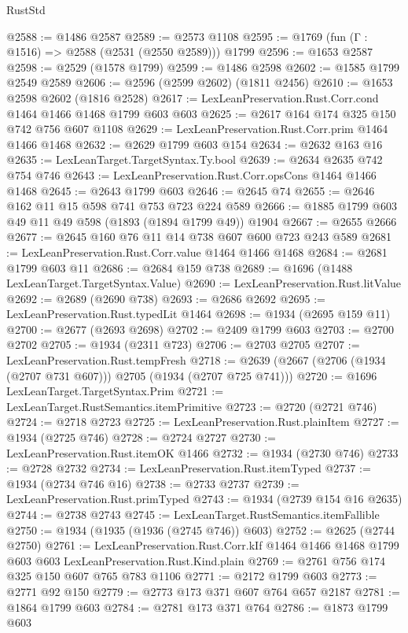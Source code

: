 \begin{lexlean}{RustStd}
\begin{coremodule}
@2588 := @1486 @2587
@2589 := @2573 @1108
@2595 := @1769 (fun (Γ : @1516) => @2588 (@2531 (@2550 @2589))) @1799
@2596 := @1653 @2587
@2598 := @2529 (@1578 @1799)
@2599 := @1486 @2598
@2602 := @1585 @1799 @2549 @2589
@2606 := @2596 (@2599 @2602) (@1811 @2456)
@2610 := @1653 @2598 @2602 (@1816 @2528)
@2617 := LexLeanPreservation.Rust.Corr.cond @1464 @1466 @1468 @1799 @603 @603
@2625 := @2617 @164 @174 @325 @150 @742 @756 @607 @1108
@2629 := LexLeanPreservation.Rust.Corr.prim @1464 @1466 @1468
@2632 := @2629 @1799 @603 @154
@2634 := @2632 @163 @16
@2635 := LexLeanTarget.TargetSyntax.Ty.bool
@2639 := @2634 @2635 @742 @754 @746
@2643 := LexLeanPreservation.Rust.Corr.opsCons @1464 @1466 @1468
@2645 := @2643 @1799 @603
@2646 := @2645 @74
@2655 := @2646 @162 @11 @15 @598 @741 @753 @723 @224 @589
@2666 := @1885 @1799 @603 @49 @11 @49 @598 (@1893 (@1894 @1799 @49)) @1904
@2667 := @2655 @2666
@2677 := @2645 @160 @76 @11 @14 @738 @607 @600 @723 @243 @589
@2681 := LexLeanPreservation.Rust.Corr.value @1464 @1466 @1468
@2684 := @2681 @1799 @603 @11
@2686 := @2684 @159 @738
@2689 := @1696 (@1488 LexLeanTarget.TargetSyntax.Value)
@2690 := LexLeanPreservation.Rust.litValue
@2692 := @2689 (@2690 @738)
@2693 := @2686 @2692
@2695 := LexLeanPreservation.Rust.typedLit @1464
@2698 := @1934 (@2695 @159 @11)
@2700 := @2677 (@2693 @2698)
@2702 := @2409 @1799 @603
@2703 := @2700 @2702
@2705 := @1934 (@2311 @723)
@2706 := @2703 @2705
@2707 := LexLeanPreservation.Rust.tempFresh
@2718 := @2639 (@2667 (@2706 (@1934 (@2707 @731 @607))) @2705 (@1934 (@2707 @725 @741)))
@2720 := @1696 LexLeanTarget.TargetSyntax.Prim
@2721 := LexLeanTarget.RustSemantics.itemPrimitive
@2723 := @2720 (@2721 @746)
@2724 := @2718 @2723
@2725 := LexLeanPreservation.Rust.plainItem
@2727 := @1934 (@2725 @746)
@2728 := @2724 @2727
@2730 := LexLeanPreservation.Rust.itemOK @1466
@2732 := @1934 (@2730 @746)
@2733 := @2728 @2732
@2734 := LexLeanPreservation.Rust.itemTyped
@2737 := @1934 (@2734 @746 @16)
@2738 := @2733 @2737
@2739 := LexLeanPreservation.Rust.primTyped
@2743 := @1934 (@2739 @154 @16 @2635)
@2744 := @2738 @2743
@2745 := LexLeanTarget.RustSemantics.itemFallible
@2750 := @1934 (@1935 (@1936 (@2745 @746)) @603)
@2752 := @2625 (@2744 @2750)
@2761 := LexLeanPreservation.Rust.Corr.kIf
    @1464
    @1466
    @1468
    @1799
    @603
    @603
    LexLeanPreservation.Rust.Kind.plain
@2769 := @2761 @756 @174 @325 @150 @607 @765 @783 @1106
@2771 := @2172 @1799 @603
@2773 := @2771 @92 @150
@2779 := @2773 @173 @371 @607 @764 @657 @2187
@2781 := @1864 @1799 @603
@2784 := @2781 @173 @371 @764
@2786 := @1873 @1799 @603

\end{coremodule}
\end{lexlean}

